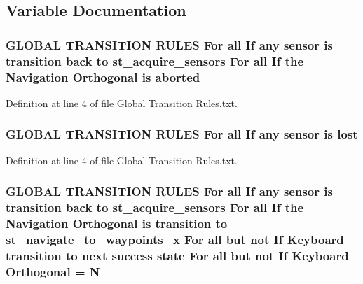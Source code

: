 \subsection{Variable Documentation}
\subsubsection[{\texorpdfstring{aborted}{aborted}}]{\setlength{\rightskip}{0pt plus 5cm}G\+L\+O\+B\+AL T\+R\+A\+N\+S\+I\+T\+I\+ON R\+U\+L\+ES For all If any sensor is transition back to st\+\_\+acquire\+\_\+sensors For all If the Navigation {\bf Orthogonal} is aborted}\hypertarget{strikes__back_2docs_2Global_01Transition_01Rules_8txt_a682ac6cc3cf2eeec69ad3f310ae363ea}{}\label{strikes__back_2docs_2Global_01Transition_01Rules_8txt_a682ac6cc3cf2eeec69ad3f310ae363ea}


Definition at line 4 of file Global Transition Rules.\+txt.

\subsubsection[{\texorpdfstring{lost}{lost}}]{\setlength{\rightskip}{0pt plus 5cm}G\+L\+O\+B\+AL T\+R\+A\+N\+S\+I\+T\+I\+ON R\+U\+L\+ES For all If any sensor is lost}\hypertarget{strikes__back_2docs_2Global_01Transition_01Rules_8txt_a21166d43cc40d1ae31189d3fe91d8346}{}\label{strikes__back_2docs_2Global_01Transition_01Rules_8txt_a21166d43cc40d1ae31189d3fe91d8346}


Definition at line 4 of file Global Transition Rules.\+txt.

\subsubsection[{\texorpdfstring{Orthogonal}{Orthogonal}}]{\setlength{\rightskip}{0pt plus 5cm}G\+L\+O\+B\+AL T\+R\+A\+N\+S\+I\+T\+I\+ON R\+U\+L\+ES For all If any sensor is transition back to st\+\_\+acquire\+\_\+sensors For all If the Navigation Orthogonal is transition to st\+\_\+navigate\+\_\+to\+\_\+waypoints\+\_\+x For all but not If Keyboard transition to next success state For all but not If Keyboard Orthogonal = N}\hypertarget{strikes__back_2docs_2Global_01Transition_01Rules_8txt_a2e1cdec29dad5013e514270d0a78fe22}{}\label{strikes__back_2docs_2Global_01Transition_01Rules_8txt_a2e1cdec29dad5013e514270d0a78fe22}


